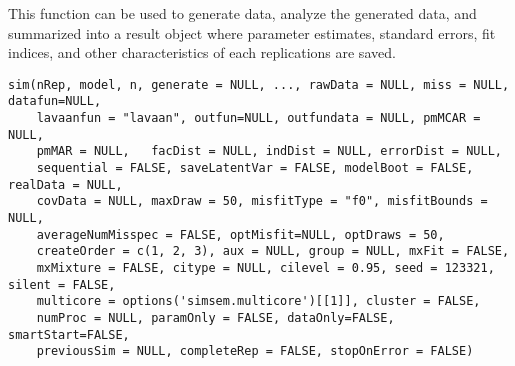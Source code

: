 \documentclass[a4paper]{book}
\begin{document}
%
\begin{Description}\relax
This function can be used to generate data, analyze the generated data, and summarized into a result object where parameter estimates, standard errors, fit indices, and other characteristics of each replications are saved. 
\end{Description}
%
\begin{Usage}
\begin{verbatim}
sim(nRep, model, n, generate = NULL, ..., rawData = NULL, miss = NULL, datafun=NULL, 
	lavaanfun = "lavaan", outfun=NULL, outfundata = NULL, pmMCAR = NULL, 
	pmMAR = NULL, 	facDist = NULL, indDist = NULL, errorDist = NULL, 
	sequential = FALSE, saveLatentVar = FALSE, modelBoot = FALSE, realData = NULL, 
	covData = NULL, maxDraw = 50, misfitType = "f0", misfitBounds = NULL, 
	averageNumMisspec = FALSE, optMisfit=NULL, optDraws = 50, 
	createOrder = c(1, 2, 3), aux = NULL, group = NULL, mxFit = FALSE, 
	mxMixture = FALSE, citype = NULL, cilevel = 0.95, seed = 123321, silent = FALSE, 
	multicore = options('simsem.multicore')[[1]], cluster = FALSE, 
	numProc = NULL, paramOnly = FALSE, dataOnly=FALSE, smartStart=FALSE, 
	previousSim = NULL, completeRep = FALSE, stopOnError = FALSE)
\end{verbatim}
\end{Usage}
%
\end{document}
